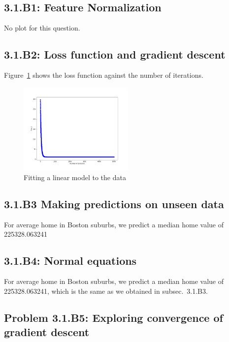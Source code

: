 \documentclass[english,11pt]{article}
\begin{document}
\subsection*{3.1.B1: Feature Normalization}
No plot for this question.

\subsection*{3.1.B2: Loss function and gradient descent}
Figure~\ref{fig:3_1_B2} shows the loss function against the number of iterations.
\begin{figure}[H]
\centering
\includegraphics[width=0.5\textwidth]{../hw1/part1/fig3_1_B_Muiti.png}
\caption{Fitting a linear model to the data}
\label{fig:3_1_B2}
\end{figure}

\subsection*{3.1.B3 Making predictions on unseen data\label{subsec:3_1_B3}}
For average home in Boston suburbs, we predict a median home value of 225328.063241

\subsection*{3.1.B4: Normal equations}
For average home in Boston suburbs, we predict a median home value of 225328.063241, which is the same as we obtained in subsec.~3.1.B3.


\subsection*{Problem 3.1.B5: Exploring convergence of gradient descent}
\end{document}
